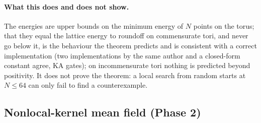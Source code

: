 \documentclass[11pt,a4paper]{article}
\begin{document}
\paragraph{What this does and does not show.} The energies are upper bounds on the minimum energy of $N$ points on the torus;
that they equal the lattice energy to roundoff on commensurate tori, and never go below it, is the behaviour the theorem
predicts and is consistent with a correct implementation (two implementations by the same author and a closed-form constant agree,
KA gates); on incommensurate tori nothing is predicted beyond positivity. It does not prove the theorem: a local search from
random starts at $N\le64$ can only fail to find a counterexample.

\subsection{Nonlocal-kernel mean field (Phase 2)}
\end{document}
